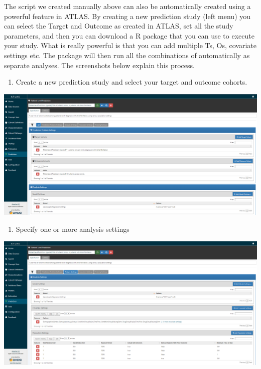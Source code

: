\documentclass[]{book}
\providecommand{\tightlist}{%
  \setlength{\itemsep}{0pt}\setlength{\parskip}{0pt}}
\begin{document}
The script we created manually above can also be automatically created
using a powerful feature in ATLAS. By creating a new prediction study
(left menu) you can select the Target and Outcome as created in ATLAS,
set all the study parameters, and then you can download a R package that
you can use to execute your study. What is really powerful is that you
can add multiple Ts, Os, covariate settings etc. The package will then
run all the combinations of automatically as separate analyses. The
screenshots below explain this process.

\begin{enumerate}
\def\labelenumi{\arabic{enumi}.}
\tightlist
\item
  Create a new prediction study and select your target and outcome
  cohorts.
\end{enumerate}

\includegraphics{images/PatientLevelPrediction/atlasplp1.png}

\begin{enumerate}
\def\labelenumi{\arabic{enumi}.}
\setcounter{enumi}{1}
\tightlist
\item
  Specify one or more analysis settings
\end{enumerate}

\includegraphics{images/PatientLevelPrediction/atlasplp2.png}
\end{document}
